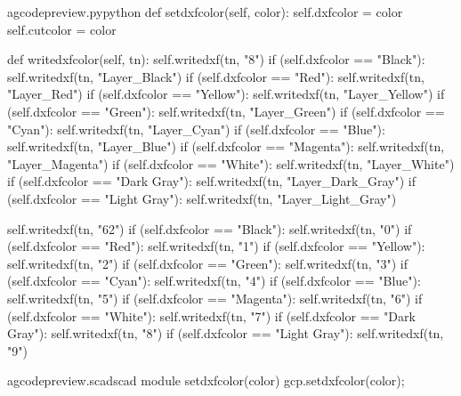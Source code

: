 \documentclass{ltxdoc}
\begin{document}
\lstset{firstnumber=\thegcpy}
\begin{writecode}{a}{gcodepreview.py}{python}
    def setdxfcolor(self, color):
        self.dxfcolor = color
        self.cutcolor = color

    def writedxfcolor(self, tn):
            self.writedxf(tn, "8")
            if (self.dxfcolor == "Black"):
                self.writedxf(tn, "Layer_Black")
            if (self.dxfcolor == "Red"):
                self.writedxf(tn, "Layer_Red")
            if (self.dxfcolor == "Yellow"):
                self.writedxf(tn, "Layer_Yellow")
            if (self.dxfcolor == "Green"):
                self.writedxf(tn, "Layer_Green")
            if (self.dxfcolor == "Cyan"):
                self.writedxf(tn, "Layer_Cyan")
            if (self.dxfcolor == "Blue"):
                self.writedxf(tn, "Layer_Blue")
            if (self.dxfcolor == "Magenta"):
                self.writedxf(tn, "Layer_Magenta")
            if (self.dxfcolor == "White"):
                self.writedxf(tn, "Layer_White")
            if (self.dxfcolor == "Dark Gray"):
                self.writedxf(tn, "Layer_Dark_Gray")
            if (self.dxfcolor == "Light Gray"):
                self.writedxf(tn, "Layer_Light_Gray")

            self.writedxf(tn, "62")
            if (self.dxfcolor == "Black"):
                self.writedxf(tn, "0")
            if (self.dxfcolor == "Red"):
                self.writedxf(tn, "1")
            if (self.dxfcolor == "Yellow"):
                self.writedxf(tn, "2")
            if (self.dxfcolor == "Green"):
                self.writedxf(tn, "3")
            if (self.dxfcolor == "Cyan"):
                self.writedxf(tn, "4")
            if (self.dxfcolor == "Blue"):
                self.writedxf(tn, "5")
            if (self.dxfcolor == "Magenta"):
                self.writedxf(tn, "6")
            if (self.dxfcolor == "White"):
                self.writedxf(tn, "7")
            if (self.dxfcolor == "Dark Gray"):
                self.writedxf(tn, "8")
            if (self.dxfcolor == "Light Gray"):
                self.writedxf(tn, "9")

\end{writecode}
\addtocounter{gcpy}{48}

\lstset{firstnumber=\thegcpscad}
\begin{writecode}{a}{gcodepreview.scad}{scad}
module setdxfcolor(color){
    gcp.setdxfcolor(color);
}

\end{writecode}
\addtocounter{gcpscad}{4}
\end{document}
